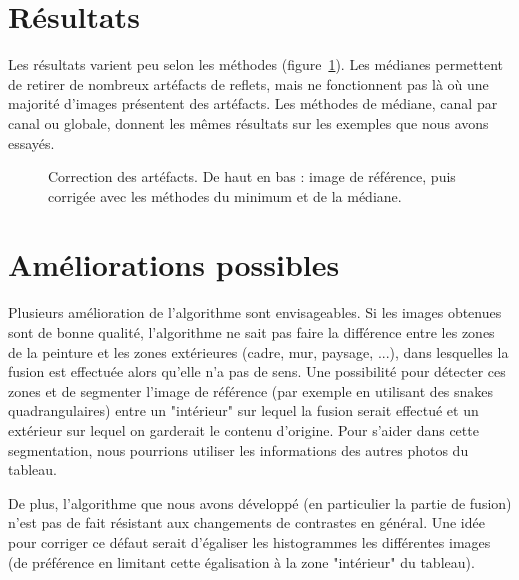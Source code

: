 \documentclass[12pt,a4paper]{article}
\begin{document}
\section{Résultats}
Les résultats varient peu selon les méthodes (figure~\ref{mediane}). Les médianes permettent de retirer de nombreux artéfacts de reflets, mais ne fonctionnent pas là où une majorité d'images présentent des artéfacts. Les méthodes de médiane, canal par canal ou globale, donnent les mêmes résultats sur les exemples que nous avons essayés.
\begin{figure}
\centering
\begin{minipage}{0.6\linewidth}
\end{minipage}
\begin{minipage}{0.6\linewidth}
\end{minipage}
\begin{minipage}{0.6\linewidth}
\end{minipage}
\caption{Correction des artéfacts. De haut en bas : image de référence, puis corrigée avec les méthodes du minimum et de la médiane.}
\label{mediane}
\end{figure} 
\section{Améliorations possibles}

Plusieurs amélioration de l'algorithme sont envisageables. Si les images obtenues sont de bonne qualité, l'algorithme ne sait pas faire la différence entre les zones de la peinture et les zones extérieures (cadre, mur, paysage, ...), dans lesquelles la fusion est effectuée alors qu'elle n'a pas de sens. Une possibilité pour détecter ces zones et de segmenter l'image de référence (par exemple en utilisant des snakes quadrangulaires) entre un "intérieur" sur lequel la fusion serait effectué et un extérieur sur lequel on garderait le contenu d'origine. Pour s'aider dans cette segmentation, nous pourrions utiliser les informations des autres photos du tableau.

De plus, l'algorithme que nous avons développé (en particulier la partie de fusion) n'est pas de fait résistant aux changements de contrastes en général. Une idée pour corriger ce défaut serait d'égaliser les histogrammes les différentes images (de préférence en limitant cette égalisation à la zone "intérieur" du tableau).


\end{document}
